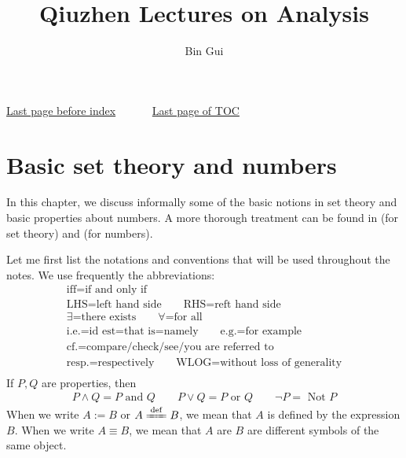 \documentclass[12pt,b5paper,notitlepage]{article}
\title{Qiuzhen Lectures on Analysis}
\author{{\sc Bin Gui}
}
\theoremstyle{definition}
\theoremstyle{plain}
\numberwithin{equation}{section}
\begin{document}
\sloppy %
	\setcounter{page}{1}



	









	
	\maketitle
\small  \hyperlink{beforeindex}{Last page before index}~~~~~~   \hyperlink{page.3}{Last page of TOC}
\normalsize



\makeatletter
\newcommand*{\toccontents}{}
\makeatother
\toccontents



	


\newpage

\section{Basic set theory and numbers}


In this chapter, we discuss informally some of the basic notions in set theory and basic properties about numbers. A more thorough treatment can be found in \cite[Ch. 1]{Mun} (for set theory) and \cite[Ch. 1]{Rud-P} (for numbers). 

Let me first list the notations and conventions that will be used throughout the notes. We use frequently the abbreviations:
\begin{gather*}
\text{iff=if and only if}\\
\text{LHS=left hand side}\qquad
\text{RHS=reft hand side}\\
\text{$\exists$=there exists}\qquad \text{$\forall$=for all}\\
\text{i.e.=id est=that is=namely}\qquad\text{e.g.=for example}\\
\text{cf.=compare/check/see/you are referred to}\\
\text{resp.=respectively}\qquad 
\text{WLOG=without loss of generality}\\
\end{gather*}
If $P,Q$ are properties, then
\begin{align*}
P\land Q=P\text{ and }Q\qquad P\lor Q=P\text{ or }Q\qquad \neg P=\text{ Not }P
\end{align*}
When we write $A:=B$ or $A\xlongequal{\mathrm{def}}B$, we mean that $A$ is defined by the expression $B$. When we write $A\equiv B$, we mean that $A$ are $B$ are different symbols of the same object.
\end{document}
